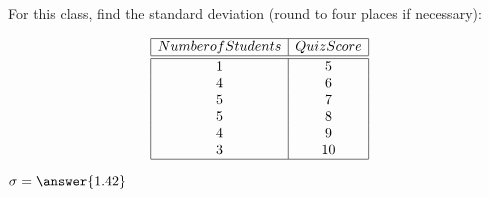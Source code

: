 \documentclass{ximera}
\begin{document}
 
 \begin{problem}
For this class, find the standard deviation (round to four places if necessary):

$$\begin{array}{|c|c|}
\hline
Number of Students & Quiz Score\\
\hline
\hline
1 & 5\\
4 & 6\\
5 & 7\\
5 & 8\\
4 & 9\\
3 & 10\\
\hline
\end{array}$$


$\sigma=\answer{1.42}$


\end{problem}

 
 
      
\end{document}
